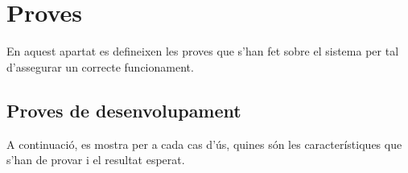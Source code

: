 
\chapter{Proves} %


\label{Proves} %

En aquest apartat es defineixen les proves que s'han fet sobre el sistema per tal d'assegurar un correcte funcionament.

\section{Proves de desenvolupament}

A continuació, es mostra per a cada cas d'ús, quines són les característiques que s'han de provar i el resultat esperat.

